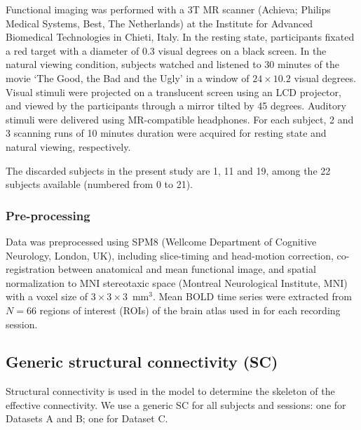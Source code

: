 \documentclass{article}
\begin{document}
Functional imaging was performed with a 3T MR scanner (Achieva; Philips Medical Systems, Best, The Netherlands) at the Institute for Advanced Biomedical Technologies in Chieti, Italy.
In the resting state, participants fixated a red target with a diameter of 0.3 visual degrees on a black screen. In the natural viewing condition, subjects watched and listened to 30 minutes of the movie `The Good, the Bad and the Ugly' in a window of $24\times10.2$ visual degrees. Visual stimuli were projected on a translucent screen using an LCD projector, and viewed by the participants through a mirror tilted by 45 degrees. Auditory stimuli were delivered using MR-compatible headphones.
For each subject, 2 and 3 scanning runs of 10 minutes duration were acquired for resting state and natural viewing, respectively. 

The discarded subjects in the present study are 1, 11 and 19, among the 22 subjects available (numbered from 0 to 21).

\subsubsection{Pre-processing}

Data was preprocessed using SPM8 (Wellcome Department of Cognitive Neurology, London, UK), including slice-timing and head-motion correction, co-registration between anatomical and mean functional image, and spatial normalization to MNI stereotaxic space (Montreal Neurological Institute, MNI) with a voxel size of $3 \times 3 \times 3$~mm$^3$. 
Mean BOLD time series were extracted from $N = 66$ regions of interest (ROIs) of the brain atlas used in \cite{Hagmann_PB_2008} for each recording session. 


\subsection{Generic structural connectivity (SC)}

Structural connectivity is used in the model to determine the skeleton of the effective connectivity. We use a generic SC for all subjects and sessions: one for Datasets A and B; one for Dataset C.
\end{document}
